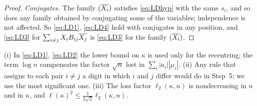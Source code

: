 \begin{proof}
\emph{Conjugates.} The family $(\overline{X_i})$ satisfies \eqref{eq:LDhyp} with the same $s_i$, and so does any family obtained by conjugating some of the variables; independence is not affected. So \eqref{eq:LD1}, \eqref{eq:LD4} hold with conjugates in any position, and
\eqref{eq:LD3} for $\sum_{i\ne j}X_iB_{ij}\overline{X_j}$ is \eqref{eq:LD3} for the family $(\overline{X_i})$.
\end{proof}
\begin{remark}\label{rem:LDn}
\textup{(i)} In \eqref{eq:LD1}, \eqref{eq:LD2} the lower bound on $\kappa$ is used only for the recentring; the term $\log n$ compensates the factor $\sqrt n$ lost in $\sum_i|a_i||\mu_i|$.
\textup{(ii)} Any rule that assigns to each pair $i\ne j$ a digit in which $i$ and $j$ differ would do in Step~5; we use the most significant one.
\textup{(iii)} The loss factor $\ell_2(\kappa,n)$ is nondecreasing in $n$ and in $\kappa$, and $\ell(\kappa)^2\le\frac1{2\sqrt2}\ell_2(\kappa,n)$.
\end{remark}

